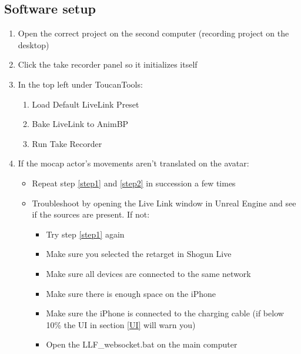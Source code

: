 \subsection{Software setup}
\begin{enumerate}
    \item Open the correct project on the second computer (recording project on the desktop)
    \item Click the take recorder panel so it initializes itself
    \item In the top left under ToucanTools:
    \begin{enumerate}
        \item Load Default LiveLink Preset\label{step1}
        \item Bake LiveLink to AnimBP\label{step2}
        \item Run Take Recorder
    \end{enumerate}
    \item If the mocap actor's movements aren't translated on the avatar:
    \begin{itemize}
        \item Repeat step \ref{step1} and \ref{step2} in succession a few times
        \item Troubleshoot by opening the Live Link window in Unreal Engine and see if the sources are present. If not:
        \begin{itemize}
            \item Try step \ref{step1} again
            \item Make sure you selected the retarget in Shogun Live
            \item Make sure all devices are connected to the same network
            \item Make sure there is enough space on the iPhone
            \item Make sure the iPhone is connected to the charging cable (if below 10\% the UI in section \ref{UI} will warn you)
            \item Open the LLF\_websocket.bat on the main computer
        \end{itemize}
    \end{itemize}
\end{enumerate}
